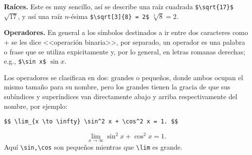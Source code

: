 \documentclass[intro-breve-latex.tex]{subfiles}
\begin{document}
\textbf{Raíces.}
Este es muy sencillo, así se describe una raíz cuadrada \lstinline|$\sqrt{17}$| $\sqrt{17}$, y así una raíz $n$-ésima
\lstinline|$\sqrt[3]{8} = 2$| $\sqrt[3]{8} = 2$.

\textbf{Operadores.}
En general a los símbolos destinados a ir entre dos caracteres como + se les dice <<operación binaria>>, por separado,
un operador es una palabra o frase que se utiliza expicitamente y, por lo general, en letras romanas derechas; e.g.,
\lstinline|$\sin x$| $\sin x$.

Los operadores se clasifican en dos: grandes o pequeños, donde ambos ocupan el mismo tamaño para su nombre, pero los
grandes tienen la gracia de que sus subíndices y superíndices van directamente abajo y arriba respectivamente del
nombre, por ejemplo:
\begin{lstlisting}
$$ \lim_{x \to \infty} \sin^2 x + \cos^2 x = 1. $$
\end{lstlisting}
$$ \lim_{x \to \infty} \sin^2 x + \cos^2 x = 1. $$
Aquí \lstinline|\sin,\cos| son pequeños mientras que \lstinline|\lim| es grande.
\end{document}
